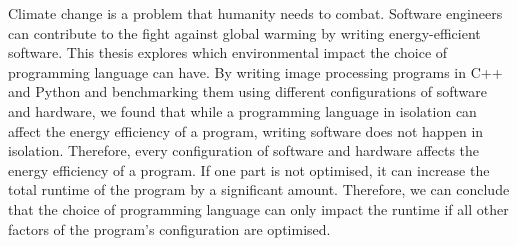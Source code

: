 Climate change is a problem that humanity needs to combat.
Software engineers can contribute to the fight against global warming by writing energy-efficient software.
This thesis explores which environmental impact the choice of programming language can have.
By writing image processing programs in C++ and Python and benchmarking them using different configurations of software and
hardware, we found that while a programming language in isolation can affect the energy efficiency of a program,
writing software does not happen in isolation.
Therefore, every configuration of software and hardware affects the energy efficiency of a program.
If one part is not optimised, it can increase the total runtime of the program by a significant amount.
Therefore, we can conclude that the choice of programming language can only impact the runtime if all other factors of the program's configuration are optimised.

